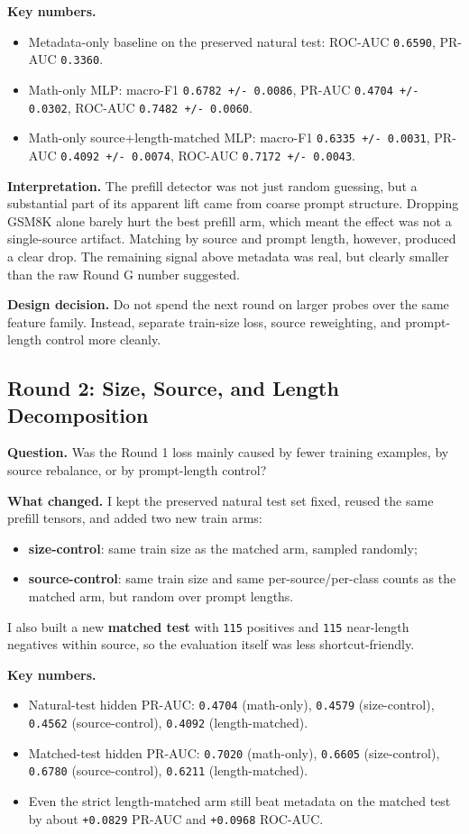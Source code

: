 \documentclass[11pt]{article}
\begin{document}
\textbf{Key numbers.}
\begin{itemize}
  \item Metadata-only baseline on the preserved natural test: ROC-AUC \texttt{0.6590}, PR-AUC \texttt{0.3360}.
  \item Math-only MLP: macro-F1 \texttt{0.6782 +/- 0.0086}, PR-AUC \texttt{0.4704 +/- 0.0302}, ROC-AUC \texttt{0.7482 +/- 0.0060}.
  \item Math-only source+length-matched MLP: macro-F1 \texttt{0.6335 +/- 0.0031}, PR-AUC \texttt{0.4092 +/- 0.0074}, ROC-AUC \texttt{0.7172 +/- 0.0043}.
\end{itemize}

\textbf{Interpretation.} The prefill detector was not just random guessing, but a substantial part of its apparent lift came from coarse prompt structure. Dropping GSM8K alone barely hurt the best prefill arm, which meant the effect was not a single-source artifact. Matching by source and prompt length, however, produced a clear drop. The remaining signal above metadata was real, but clearly smaller than the raw Round G number suggested.

\textbf{Design decision.} Do not spend the next round on larger probes over the same feature family. Instead, separate train-size loss, source reweighting, and prompt-length control more cleanly.

\subsection*{Round 2: Size, Source, and Length Decomposition}
\textbf{Question.} Was the Round 1 loss mainly caused by fewer training examples, by source rebalance, or by prompt-length control?

\textbf{What changed.} I kept the preserved natural test set fixed, reused the same prefill tensors, and added two new train arms:
\begin{itemize}
  \item \textbf{size-control}: same train size as the matched arm, sampled randomly;
  \item \textbf{source-control}: same train size and same per-source/per-class counts as the matched arm, but random over prompt lengths.
\end{itemize}
I also built a new \textbf{matched test} with \texttt{115} positives and \texttt{115} near-length negatives within source, so the evaluation itself was less shortcut-friendly.

\textbf{Key numbers.}
\begin{itemize}
  \item Natural-test hidden PR-AUC:
    \texttt{0.4704} (math-only),
    \texttt{0.4579} (size-control),
    \texttt{0.4562} (source-control),
    \texttt{0.4092} (length-matched).
  \item Matched-test hidden PR-AUC:
    \texttt{0.7020} (math-only),
    \texttt{0.6605} (size-control),
    \texttt{0.6780} (source-control),
    \texttt{0.6211} (length-matched).
  \item Even the strict length-matched arm still beat metadata on the matched test by about \texttt{+0.0829} PR-AUC and \texttt{+0.0968} ROC-AUC.
\end{itemize}
\end{document}
